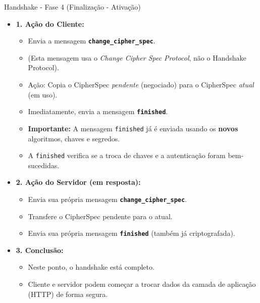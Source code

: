 \begin{frame}{Handshake - Fase 4 (Finalização - Ativação)}
    \begin{itemize}
        \item \textbf{1. Ação do Cliente:}
              \begin{itemize}
                  \item Envia a mensagem \textbf{\texttt{change\_cipher\_spec}}.
                  \item (Esta mensagem usa o \textit{Change Cipher Spec Protocol}, não o Handshake Protocol).
                  \item Ação: Copia o CipherSpec \textit{pendente} (negociado) para o CipherSpec \textit{atual} (em uso).
                  \item Imediatamente, envia a mensagem \textbf{\texttt{finished}}.
                  \item \textbf{Importante:} A mensagem \texttt{finished} já é enviada usando os \textbf{novos} algoritmos, chaves e segredos.
                  \item A \texttt{finished} verifica se a troca de chaves e a autenticação foram bem-sucedidas.
              \end{itemize}

        \item \textbf{2. Ação do Servidor (em resposta):}
              \begin{itemize}
                  \item Envia sua própria mensagem \textbf{\texttt{change\_cipher\_spec}}.
                  \item Transfere o CipherSpec pendente para o atual.
                  \item Envia sua própria mensagem \textbf{\texttt{finished}} (também já criptografada).
              \end{itemize}

        \item \textbf{3. Conclusão:}
              \begin{itemize}
                  \item Neste ponto, o handshake está completo.
                  \item Cliente e servidor podem começar a trocar dados da camada de aplicação (HTTP) de forma segura.
              \end{itemize}
    \end{itemize}
\end{frame}


